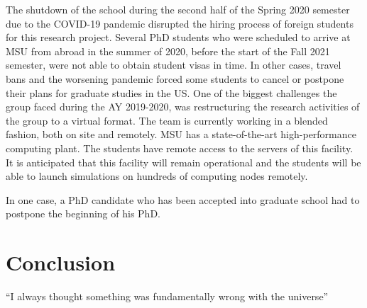 \documentclass{article}
\begin{document}
The shutdown of the school during the second half of the Spring 2020 semester due to the COVID-19 pandemic disrupted the hiring process of foreign students for this research project. Several PhD students who were scheduled to arrive at MSU from abroad in the summer of 2020, before the start of the Fall 2021 semester, were not able to obtain student visas in time. In other cases, travel bans and the worsening pandemic forced some students to cancel or postpone their plans for graduate studies in the US. 
One of the biggest challenges the group faced during the AY 2019-2020, was restructuring the research activities of the group to a virtual format. The team is currently working in a blended fashion, both on site and remotely. MSU has a state-of-the-art high-performance computing plant. The students have remote access to the servers of this facility. It is anticipated that this facility will remain operational and the students will be able to launch simulations on hundreds of computing nodes remotely.
 
In one case, a PhD candidate who has been accepted into graduate school had to postpone the beginning of his PhD.

\section{Conclusion}
``I always thought something was fundamentally wrong with the universe'' \citep{adams1995hitchhiker}



\end{document}

